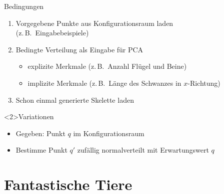 \documentclass{beamer}
\newcommand{\zb}{z.\,B.\ }
\begin{document}
\addtocounter{framenumber}{5}
\begin{frame}{Bedingungen}
 \begin{enumerate}
  \item Vorgegebene Punkte aus Konfigurationsraum laden\\ (\zb Eingabebeispiele)
  \item Bedingte Verteilung als Eingabe für PCA
  \begin{itemize}
   \item explizite Merkmale (\zb Anzahl Flügel und Beine)
   \item implizite Merkmale (\zb Länge des Schwanzes in $x$-Richtung)
  \end{itemize}
  \item Schon einmal generierte Skelette laden
 \end{enumerate}
 \begin{block}<2>{Variationen}
  \begin{itemize}
   \item Gegeben: Punkt $q$ im Konfigurationsraum
   \item Bestimme Punkt $q'$ zufällig normalverteilt mit Erwartungswert $q$
  \end{itemize}
 \end{block}
\end{frame}

\section{Fantastische Tiere}
\end{document}
